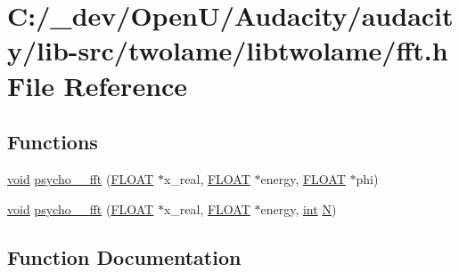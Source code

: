 \hypertarget{lib-src_2twolame_2libtwolame_2fft_8h}{}\section{C\+:/\+\_\+dev/\+Open\+U/\+Audacity/audacity/lib-\/src/twolame/libtwolame/fft.h File Reference}
\label{lib-src_2twolame_2libtwolame_2fft_8h}
\subsection*{Functions}
\begin{DoxyCompactItemize}
\item 
\hyperlink{sound_8c_ae35f5844602719cf66324f4de2a658b3}{void} \hyperlink{lib-src_2twolame_2libtwolame_2fft_8h_a59e464a815b7db63532326cc15f4ae5b}{psycho\+\_\+\_\+fft} (\hyperlink{twolame_2libtwolame_2common_8h_ae8690abbffa85934d64d545920e2b108}{F\+L\+O\+AT} $\ast$x\+\_\+real, \hyperlink{twolame_2libtwolame_2common_8h_ae8690abbffa85934d64d545920e2b108}{F\+L\+O\+AT} $\ast$energy, \hyperlink{twolame_2libtwolame_2common_8h_ae8690abbffa85934d64d545920e2b108}{F\+L\+O\+AT} $\ast$phi)
\item 
\hyperlink{sound_8c_ae35f5844602719cf66324f4de2a658b3}{void} \hyperlink{lib-src_2twolame_2libtwolame_2fft_8h_abfdef39cddd7728d78d49f1bf87aa861}{psycho\+\_\+\_\+fft} (\hyperlink{twolame_2libtwolame_2common_8h_ae8690abbffa85934d64d545920e2b108}{F\+L\+O\+AT} $\ast$x\+\_\+real, \hyperlink{twolame_2libtwolame_2common_8h_ae8690abbffa85934d64d545920e2b108}{F\+L\+O\+AT} $\ast$energy, \hyperlink{xmltok_8h_a5a0d4a5641ce434f1d23533f2b2e6653}{int} \hyperlink{rfft2d_test_m_l_8m_af6d1246b147a7c5763d9fc83082020ff}{N})
\end{DoxyCompactItemize}


\subsection{Function Documentation}
